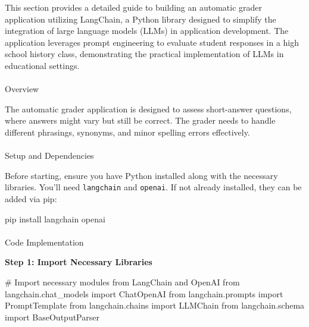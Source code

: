 \documentclass[
]{agujournal2019}
\makeatletter
\let\oldparagraph\paragraph
\renewcommand{\paragraph}{
    \@ifstar
      \xxxParagraphStar
      \xxxParagraphNoStar
  }
\newcommand{\xxxParagraphStar}[1]{\oldparagraph*{#1}\mbox{}}
\newcommand{\xxxParagraphNoStar}[1]{\oldparagraph{#1}\mbox{}}
\newenvironment{Shaded}{\begin{snugshade}}{\end{snugshade}}
\newcommand{\CommentTok}[1]{\textcolor[rgb]{0.37,0.37,0.37}{#1}}
\newcommand{\ExtensionTok}[1]{\textcolor[rgb]{0.00,0.23,0.31}{#1}}
\newcommand{\ImportTok}[1]{\textcolor[rgb]{0.00,0.46,0.62}{#1}}
\newcommand{\NormalTok}[1]{\textcolor[rgb]{0.00,0.23,0.31}{#1}}
\makeatother
\begin{document}
This section provides a detailed guide to building an automatic grader
application utilizing LangChain, a Python library designed to simplify
the integration of large language models (LLMs) in application
development. The application leverages prompt engineering to evaluate
student responses in a high school history class, demonstrating the
practical implementation of LLMs in educational settings.

\paragraph{Overview}\label{overview}

The automatic grader application is designed to assess short-answer
questions, where answers might vary but still be correct. The grader
needs to handle different phrasings, synonyms, and minor spelling errors
effectively.

\paragraph{Setup and Dependencies}\label{setup-and-dependencies}

Before starting, ensure you have Python installed along with the
necessary libraries. You'll need \texttt{langchain} and \texttt{openai}.
If not already installed, they can be added via pip:

\begin{Shaded}
\begin{Highlighting}[]
\ExtensionTok{pip}\NormalTok{ install langchain openai}
\end{Highlighting}
\end{Shaded}

\paragraph{Code Implementation}\label{code-implementation}

\textbf{Step 1: Import Necessary Libraries}

\begin{Shaded}
\begin{Highlighting}[]
\CommentTok{\# Import necessary modules from LangChain and OpenAI}
\ImportTok{from}\NormalTok{ langchain.chat\_models }\ImportTok{import}\NormalTok{ ChatOpenAI}
\ImportTok{from}\NormalTok{ langchain.prompts }\ImportTok{import}\NormalTok{ PromptTemplate}
\ImportTok{from}\NormalTok{ langchain.chains }\ImportTok{import}\NormalTok{ LLMChain}
\ImportTok{from}\NormalTok{ langchain.schema }\ImportTok{import}\NormalTok{ BaseOutputParser}
\end{Highlighting}
\end{Shaded}
\end{document}
